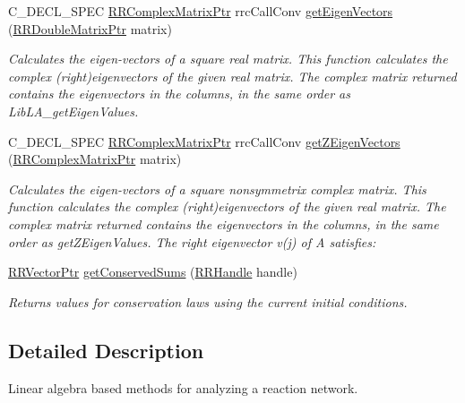 \begin{DoxyCompactItemize}
C\+\_\+\+D\+E\+C\+L\+\_\+\+S\+P\+E\+C \hyperlink{rrc__types_8h_a8cf9e865d8541d100f153800adbb7c3f}{R\+R\+Complex\+Matrix\+Ptr} rrc\+Call\+Conv \hyperlink{group___stoich_ga0c68a334f896f419160f09e140c52a5b}{get\+Eigen\+Vectors} (\hyperlink{rrc__types_8h_ae586a879d30f0823087e42d93464b5dd}{R\+R\+Double\+Matrix\+Ptr} matrix)
\begin{DoxyCompactList}\small\item\em Calculates the eigen-\/vectors of a square real matrix. This function calculates the complex (right)eigenvectors of the given real matrix. The complex matrix returned contains the eigenvectors in the columns, in the same order as Lib\+L\+A\+\_\+get\+Eigen\+Values. \end{DoxyCompactList}\item 
C\+\_\+\+D\+E\+C\+L\+\_\+\+S\+P\+E\+C \hyperlink{rrc__types_8h_a8cf9e865d8541d100f153800adbb7c3f}{R\+R\+Complex\+Matrix\+Ptr} rrc\+Call\+Conv \hyperlink{group___stoich_ga5d823d9deca09548bf65c9df30bf0aac}{get\+Z\+Eigen\+Vectors} (\hyperlink{rrc__types_8h_a8cf9e865d8541d100f153800adbb7c3f}{R\+R\+Complex\+Matrix\+Ptr} matrix)
\begin{DoxyCompactList}\small\item\em Calculates the eigen-\/vectors of a square nonsymmetrix complex matrix. This function calculates the complex (right)eigenvectors of the given real matrix. The complex matrix returned contains the eigenvectors in the columns, in the same order as get\+Z\+Eigen\+Values. The right eigenvector v(j) of A satisfies\+: \end{DoxyCompactList}\item 
\hyperlink{rrc__types_8h_a3be72d6006034fd349f753d2bf441bf7}{R\+R\+Vector\+Ptr} \hyperlink{group___stoich_gaed6227a5e35be5cfdaf667ddb3f9afe9}{get\+Conserved\+Sums} (\hyperlink{rrc__types_8h_a1d68f0592372208fa5a5f2799ea4b3ae}{R\+R\+Handle} handle)
\begin{DoxyCompactList}\small\item\em Returns values for conservation laws using the current initial conditions. \end{DoxyCompactList}\end{DoxyCompactItemize}


\subsection{Detailed Description}
Linear algebra based methods for analyzing a reaction network. 



